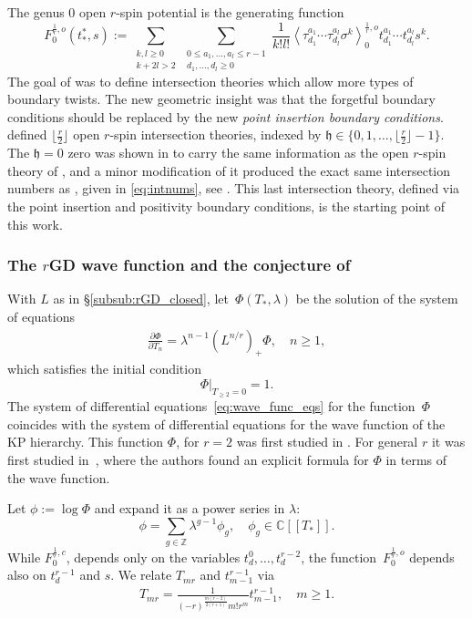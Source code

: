 \documentclass[11pt]{amsart}
\theoremstyle{definition}
\theoremstyle{remark}
\newcommand{\<}{\left<}
\renewcommand{\>}{\right>}
\numberwithin{equation}{section}
\def\C{{\mathbb C}}
\begin{document}
The genus $0$ open $r$-spin potential is the generating function
\[
F^{\frac{1}{r},o}_0(t^*_*,s):=\sum_{\substack{k,l\geq 0\\k+2l>2}} \sum_{\substack{0 \leq a_1, \ldots, a_l \leq r-1\\ d_1, \ldots, d_l \geq 0}} \frac{1}{k!l!}\<\tau^{a_1}_{d_1}\cdots\tau^{a_l}_{d_l}\sigma^k\>^{\frac{1}{r},o}_0 t^{a_1}_{d_1} \cdots t^{a_l}_{d_l}s^k.
\]
The goal of \cite{TZ1,TZ2} was to define intersection theories which allow more types of boundary twists.
The new geometric insight was that the forgetful boundary conditions should be replaced by the new \emph{point insertion boundary conditions}.
\cite{TZ2} defined $\lfloor\frac{r}{2}\rfloor$ open $r$-spin intersection theories, indexed by $\mathfrak{h}\in\{0,1,\ldots,\lfloor\frac{r}{2}\rfloor-1\}.$ The $\mathfrak{h}=0$ zero was shown in \cite[\S 5]{TZ2} to carry the same information as the open $r$-spin theory of \cite{BCT2}, and a minor modification of it produced the exact same intersection numbers as \cite{BCT2}, given in \eqref{eq:intnums}, see \cite[Remark 5.7]{TZ2}.
This last intersection theory, defined via the point insertion and positivity boundary conditions, is the starting point of this work.   

\subsubsection{The $r$GD wave function and the conjecture of \cite{BCT3}}
With $L$ as in \S \ref{subsub:rGD_closed}, let~$\Phi(T_*,\lambda)$ be the solution of the system of equations
\begin{gather}\label{eq:wave_func_eqs}
\frac{\partial\Phi}{\partial T_n}=\lambda^{n-1}(L^{n/r})_+\Phi,\quad n\geq 1,
\end{gather}
which satisfies the initial condition
$$
\left.\Phi\right|_{T_{\geq 2}=0}=1.
$$
The system of differential equations~\eqref{eq:wave_func_eqs} for the function~$\Phi$ coincides with the system of differential equations for the wave function of the KP hierarchy.
This function $\Phi$, for $r=2$ was first studied in \cite{Bur16}. For general $r$ it was first studied in~\cite{BY15}, where the authors found an explicit formula for $\Phi$ in terms of the wave function.



Let $\phi:=\log\Phi$ and expand it as a power series in $\lambda:$
$$
\phi=\sum_{g\in\mathbb{Z}}\lambda^{g-1}\phi_g,\quad \phi_g\in\C[[T_*]].
$$
While $F^{\frac{1}{r},c}_0$, depends only on the variables $t^0_d,\ldots,t^{r-2}_d$, the function~$F^{\frac{1}{r},o}_0$ depends also on $t^{r-1}_d$ and $s$. We relate $T_{mr}$ and $t^{r-1}_{m-1}$ via
\begin{gather}\label{eq:r-1_coord_change}
T_{mr}=\frac{1}{(-r)^{\frac{m(r-2)}{2(r+1)}}m!r^m}t^{r-1}_{m-1},\quad m\ge 1.
\end{gather}
\end{document}
